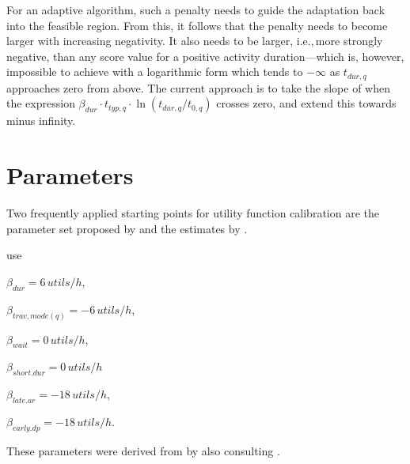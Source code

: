 For an adaptive \gls{algorithm}, such a penalty needs to guide the adaptation back into the feasible region. From this, it follows that the penalty needs to become larger with increasing negativity. It also needs to be larger, i.e.,\,more strongly negative, than any score value for a positive activity duration---which is, however, impossible to achieve with a logarithmic form which tends to $-\infty$ as $t_{dur,q}$ approaches zero from above. The current approach is to take the slope of when the expression $\beta_{dur} \cdot t_{typ,q} \cdot \ln( t_{dur,q} / t_{0,q} )$ crosses zero, and extend this towards minus infinity.


\section{Parameters}
Two frequently applied starting points for utility function calibration are the parameter set proposed by \citet[][]{CharyparNagel2005ga4acts} and the estimates by \citet[][]{Kickhoefer_MastersThesis_2009}.

\citet[][p.393]{CharyparNagel2005ga4acts} use
\begin{compactitem}
\item $\beta_{dur}= 6\, utils/h$,
\item $\beta_{trav, mode(q)}= -6\, utils/h$,
\item $\beta_{wait}=0\, utils/h$,
\item $\beta_{short.dur} = 0\, utils/h$
\item $\beta_{late.ar}=-18\, utils/h$,
\item $\beta_{early.dp}=-18\, utils/h$.
\end{compactitem}
These parameters were derived from \citet[][]{ArnottEtAl_TAER_1993} by also consulting \citet[][]{ChaumetEtAl_2006}. 

%

